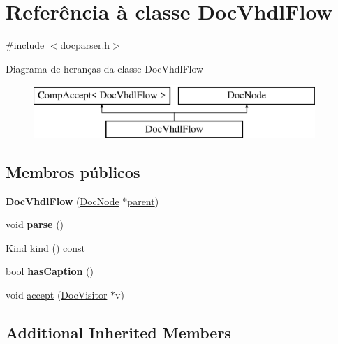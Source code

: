 \hypertarget{class_doc_vhdl_flow}{\section{Referência à classe Doc\-Vhdl\-Flow}
\label{class_doc_vhdl_flow}
}


{\ttfamily \#include $<$docparser.\-h$>$}

Diagrama de heranças da classe Doc\-Vhdl\-Flow\begin{figure}[H]
\begin{center}
\leavevmode
\includegraphics[height=2.000000cm]{class_doc_vhdl_flow}
\end{center}
\end{figure}
\subsection*{Membros públicos}
\begin{DoxyCompactItemize}
\item 
\hypertarget{class_doc_vhdl_flow_a9bf582980316b13010f6557fffd982b9}{{\bfseries Doc\-Vhdl\-Flow} (\hyperlink{class_doc_node}{Doc\-Node} $\ast$\hyperlink{class_doc_node_abd7f070d6b0a38b4da71c2806578d19d}{parent})}\label{class_doc_vhdl_flow_a9bf582980316b13010f6557fffd982b9}

\item 
\hypertarget{class_doc_vhdl_flow_ad7c704b34912678d95c13243cacf9d7f}{void {\bfseries parse} ()}\label{class_doc_vhdl_flow_ad7c704b34912678d95c13243cacf9d7f}

\item 
\hyperlink{class_doc_node_aa10c9e8951b8ccf714a59ec321bdac5b}{Kind} \hyperlink{class_doc_vhdl_flow_aa9d037bed9f9a083d0cd01485637d843}{kind} () const 
\item 
\hypertarget{class_doc_vhdl_flow_ace0ce23c9f57e5f9760e58f715154f6f}{bool {\bfseries has\-Caption} ()}\label{class_doc_vhdl_flow_ace0ce23c9f57e5f9760e58f715154f6f}

\item 
void \hyperlink{class_doc_vhdl_flow_a7ba716e854ae2f8f87a4eb2140e302b6}{accept} (\hyperlink{class_doc_visitor}{Doc\-Visitor} $\ast$v)
\end{DoxyCompactItemize}
\subsection*{Additional Inherited Members}


